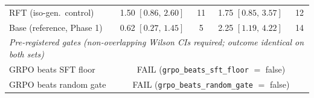\begin{table}[t]
\begin{tabular}{lcccc}
RFT (iso-gen.\ control) & 1.50 $[0.86,\,2.60]$ & 11 & 1.75 $[0.85,\,3.57]$ & 12 \\
\addlinespace
Base (reference, Phase 1) & 0.62 $[0.27,\,1.45]$ & 5 & 2.25 $[1.19,\,4.22]$ & 14 \\
\midrule
\multicolumn{5}{l}{\emph{Pre-registered gates (non-overlapping Wilson CIs required; outcome identical on both sets)}} \\
GRPO beats SFT floor    & \multicolumn{4}{c}{FAIL (\texttt{grpo\_beats\_sft\_floor} $=$ false)} \\
GRPO beats random gate  & \multicolumn{4}{c}{FAIL (\texttt{grpo\_beats\_random\_gate} $=$ false)} \\
\bottomrule
\end{tabular}
\end{table}
